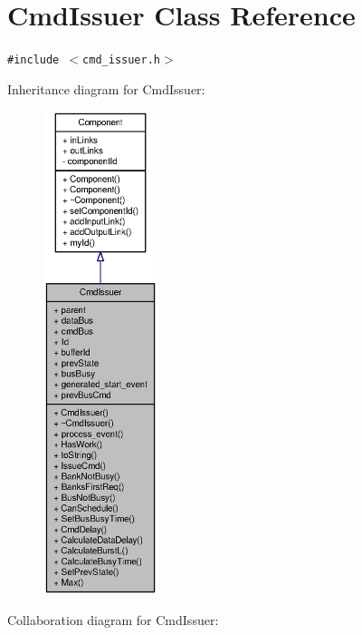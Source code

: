 \section{CmdIssuer Class Reference}
\label{classCmdIssuer}
{\tt \#include $<$cmd\_\-issuer.h$>$}

Inheritance diagram for CmdIssuer:\nopagebreak
\begin{figure}[H]
\begin{center}
\leavevmode
\includegraphics[height=400pt]{classCmdIssuer__inherit__graph}
\end{center}
\end{figure}
Collaboration diagram for CmdIssuer:\nopagebreak
